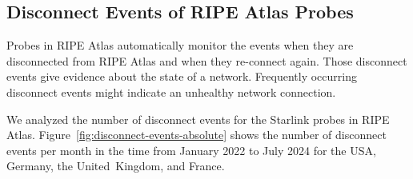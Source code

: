 \subsection{Disconnect Events of RIPE Atlas Probes} \label{sec:disconnect-events}

Probes in RIPE Atlas automatically monitor the events when they are
disconnected from RIPE Atlas and when they re-connect again. Those disconnect
events give evidence about the state of a network. Frequently occurring
disconnect events might indicate an unhealthy network connection.

We analyzed the number of disconnect events for the Starlink probes in RIPE
Atlas. Figure~\ref{fig:disconnect-events-absolute} shows the number of
disconnect events per month in the time from January 2022 to July 2024 for the
USA, Germany, the United~Kingdom, and France.

